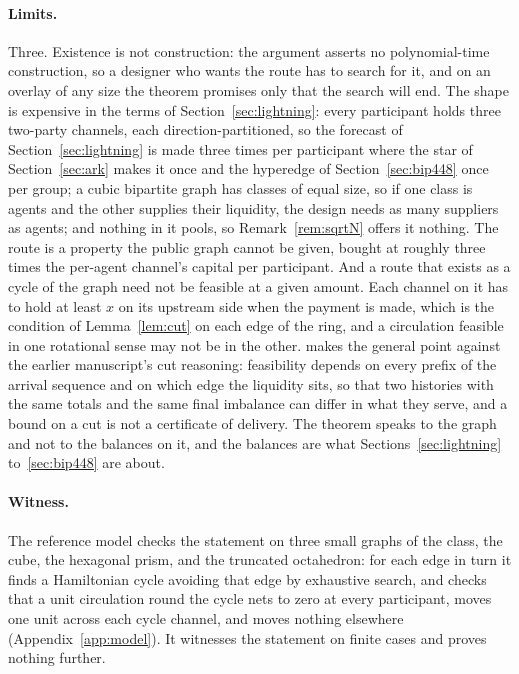 \paragraph{Limits.} Three. Existence is not construction: the argument asserts no polynomial-time construction, so a designer who wants the route has to search for it, and on an overlay of any size the theorem promises only that the search will end. The shape is expensive in the terms of Section~\ref{sec:lightning}: every participant holds three two-party channels, each direction-partitioned, so the forecast of Section~\ref{sec:lightning} is made three times per participant where the star of Section~\ref{sec:ark} makes it once and the hyperedge of Section~\ref{sec:bip448} once per group; a cubic bipartite graph has classes of equal size, so if one class is agents and the other supplies their liquidity, the design needs as many suppliers as agents; and nothing in it pools, so Remark~\ref{rem:sqrtN} offers it nothing. The route is a property the public graph cannot be given, bought at roughly three times the per-agent channel's capital per participant. And a route that exists as a cycle of the graph need not be feasible at a given amount. Each channel on it has to hold at least $x$ on its upstream side when the payment is made, which is the condition of Lemma~\ref{lem:cut} on each edge of the ring, and a circulation feasible in one rotational sense may not be in the other. \citet{dugan2026trial} makes the general point against the earlier manuscript's cut reasoning: feasibility depends on every prefix of the arrival sequence and on which edge the liquidity sits, so that two histories with the same totals and the same final imbalance can differ in what they serve, and a bound on a cut is not a certificate of delivery. The theorem speaks to the graph and not to the balances on it, and the balances are what Sections~\ref{sec:lightning} to~\ref{sec:bip448} are about.

\paragraph{Witness.} The reference model checks the statement on three small graphs of the class, the cube, the hexagonal prism, and the truncated octahedron: for each edge in turn it finds a Hamiltonian cycle avoiding that edge by exhaustive search, and checks that a unit circulation round the cycle nets to zero at every participant, moves one unit across each cycle channel, and moves nothing elsewhere (Appendix~\ref{app:model}). It witnesses the statement on finite cases and proves nothing further.

